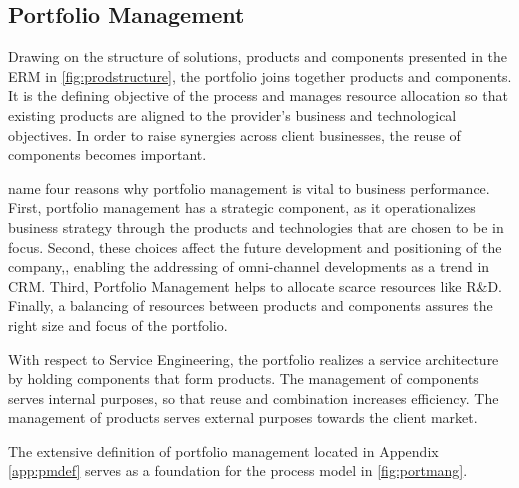 	
	
	
	\subsection{Portfolio Management}
	\label{sec:portmang}
	
	Drawing on the structure of solutions, products and components presented in the \acrshort{ERM} in \Fig \ref{fig:prodstructure}, the portfolio joins together products and components. It is the defining objective of the process and manages resource allocation so that existing products are aligned to the provider's business and technological objectives. In order to raise synergies across client businesses, the reuse of components becomes important. 
	
	\cite{cooper1999new} name four reasons why portfolio management is vital to business performance. First, portfolio management has a strategic component, as it operationalizes business strategy through the products and technologies that are chosen to be in focus. Second, these choices affect the future development and positioning of the company,\eg, enabling the addressing of omni-channel developments as a trend in \acrshort{CRM}. Third, Portfolio Management helps to allocate scarce resources like R\&D. Finally, a balancing of resources between products and components assures the right size and focus of the portfolio.     
	
	With respect to Service Engineering, the portfolio realizes a service architecture  \citep{Bohmann2006} by holding components that form products. The management of components serves internal purposes, so that reuse and combination increases efficiency. The management of products serves external purposes towards the client market. 
	
	The extensive definition of portfolio management \citep[]{cooper1999new} located in Appendix \ref{app:pmdef} serves as a foundation for the process model in \Fig \ref{fig:portmang}. 
	
